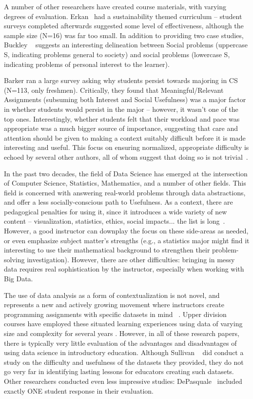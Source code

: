A number of other researchers have created course materials, with varying degrees of evaluation.
Erkan~\cite{Erkan:2012} had a sustainability themed curriculum -- student surveys completed afterwards suggested some level of effectiveness, although the sample size (N=16) was far too small.
In addition to providing two case studies, Buckley ~\cite{Buckley:2008} suggests an interesting delineation between Social problems (uppercase S, indicating problems general to society) and social problems (lowercase S, indicating problems of personal interest to the learner).


Barker ran a large survey asking why students persist towards majoring in CS~\cite{Barker:2009} (N=113, only freshmen).
Critically, they found that Meaningful/Relevant Assignments (subsuming both Interest and Social Usefulness) was a major factor in whether students would persist in the major -- however, it wasn't one of the top ones.
Interestingly, whether students felt that their workload and pace was appropriate was a much bigger source of importance, suggesting that care and attention should be given to making a context suitably difficult before it is made interesting and useful.
This focus on ensuring normalized, appropriate difficulty is echoed by several other authors, all of whom suggest that doing so is not trivial~\cite{Rader:2011, Stevenson:2006}.

In the past two decades, the field of Data Science has emerged at the intersection of Computer Science, Statistics, Mathematics, and a number of other fields.
This field is concerned with answering real-world problems through data abstractions, and offer a less socially-conscious path to Usefulness.
As a context, there are pedagogical penalties for using it, since it introduces a wide variety of new content -- visualization, statistics, ethics, social impacts... the list is long~\cite{Anderson:2015-DP2}.
However, a good instructor can downplay the focus on these side-areas as needed, or even emphasize subject matter's strengths (e.g., a statistics major might find it interesting to use their mathematical background to strengthen their problem-solving investigation).
However, there are other difficulties: bringing in messy data requires real sophistication by the instructor, especially when working with Big Data.

The use of data analysis as a form of contextualization is not novel, and represents a new and actively growing movement where instructors create programming assignments with specific datasets in mind ~\cite{Anderson, Sullivan:2013, Hall-Holt:2015, DePasquale:2006}.
Upper division courses have employed these situated learning experiences using data of varying size and complexity for several years \cite{Egger, datamining, Waldman}.
However, in all of these research papers, there is typically very little evaluation of the advantages and disadvantages of using data science in introductory education.
Although Sullivan ~\cite{Sullivan:2013} did conduct a study on the difficulty and usefulness of the datasets they provided, they do not go very far in identifying lasting lessons for educators creating such datasets.
Other researchers conducted even less impressive studies: DePasquale~\cite{DePasquale:2006} included exactly ONE student response in their evaluation.

